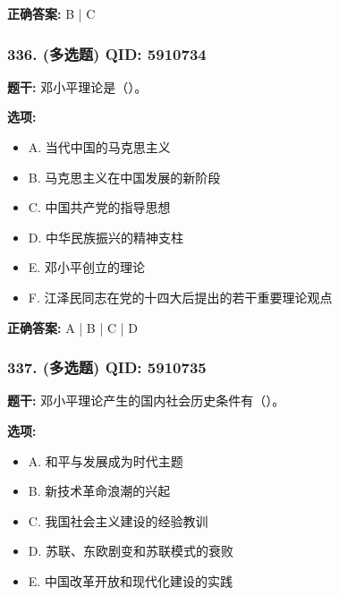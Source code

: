 \documentclass[12pt,UTF8]{ctexart}
\begin{document}
\textbf{正确答案:}
B | C

\vspace{0.3em}\hrulefill\vspace{0.7em}

\subsubsection*{336. (多选题) \small QID: 5910734}

\textbf{题干:}
邓小平理论是（）。

\textbf{选项:}
\begin{itemize}[leftmargin=*]

  \item A. 当代中国的马克思主义

  \item B. 马克思主义在中国发展的新阶段

  \item C. 中国共产党的指导思想

  \item D. 中华民族振兴的精神支柱

  \item E. 邓小平创立的理论

  \item F. 江泽民同志在党的十四大后提出的若干重要理论观点

\end{itemize}

\textbf{正确答案:}
A | B | C | D

\vspace{0.3em}\hrulefill\vspace{0.7em}

\subsubsection*{337. (多选题) \small QID: 5910735}

\textbf{题干:}
邓小平理论产生的国内社会历史条件有（）。

\textbf{选项:}
\begin{itemize}[leftmargin=*]

  \item A. 和平与发展成为时代主题

  \item B. 新技术革命浪潮的兴起

  \item C. 我国社会主义建设的经验教训

  \item D. 苏联、东欧剧变和苏联模式的衰败

  \item E. 中国改革开放和现代化建设的实践

\end{itemize}
\end{document}
